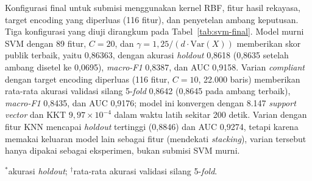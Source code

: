 Konfigurasi final untuk submisi menggunakan kernel RBF, fitur hasil rekayasa,
target encoding yang diperluas (116 fitur), dan penyetelan ambang keputusan.
Tiga konfigurasi yang diuji dirangkum pada Tabel~\ref{tab:svm-final}. Model
murni SVM dengan 89 fitur, $C=20$, dan $\gamma = 1{,}25/(d\cdot\mathrm{Var}(X))$
memberikan skor publik terbaik, yaitu 0,86363, dengan akurasi \textit{holdout}
0,8618 (0,8635 setelah ambang disetel ke 0,0695), \textit{macro-F1} 0,8387, dan
AUC 0,9158. Varian \textit{compliant} dengan target encoding diperluas (116
fitur, $C=10$, 22.000 baris) memberikan rata-rata akurasi validasi silang
5-\textit{fold} 0,8642 (0,8645 pada ambang terbaik), \textit{macro-F1} 0,8435,
dan AUC 0,9176; model ini konvergen dengan 8.147 \textit{support vector} dan
KKT $9{,}97\times10^{-4}$ dalam waktu latih sekitar 200 detik. Varian dengan
fitur KNN mencapai \textit{holdout} tertinggi (0,8846) dan AUC 0,9274, tetapi
karena memakai keluaran model lain sebagai fitur (mendekati \textit{stacking}),
varian tersebut hanya dipakai sebagai eksperimen, bukan submisi SVM murni.

\begin{table}[htbp]
  \centering
  \caption{Ringkasan konfigurasi SVM final dan performanya beserta skor publik
  pada data uji Kaggle.}
  \label{tab:svm-final}
  \footnotesize
  \par\vspace{2pt}
  {\scriptsize $^{*}$akurasi \textit{holdout}; $^{\dagger}$rata-rata akurasi
  validasi silang 5-\textit{fold}.}
\end{table}

